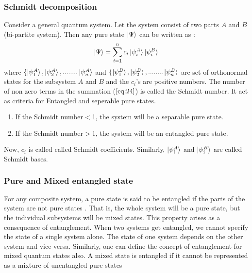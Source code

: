\documentclass[12pt,a4paper]{report}
\begin{document}
\subsubsection{Schmidt decomposition}
Consider a general quantum system. Let the system consist of two parts $A$ and $B$ (bi-partite system). Then any pure state $\ket{\Psi}$ can be written as :
\begin{equation}
\ket{\Psi} = \sum_{i=1}^{n} c_{i}\ket{\psi_{i}^{A}}\ket{\psi_{i}^{B}}
\end{equation} 
\label{eq:24}
where  $\{\ket{\psi_{1}^{A}},\ket{\psi_{2}^{A}},........\ket{\psi_{n}^{A}}$ and $\{\ket{\psi_{1}^{B}},\ket{\psi_{2}^{B}},........\ket{\psi_{n}^{B}}$ are set of orthonormal states for the subsystem $A$ and $B$ and the $c_{i}$’s are positive numbers. The number of non zero terms in the summation ($\ref{eq:24}$) is called the Schmidt number. It act as criteria for Entangled and seperable pure states.
\begin{enumerate}
\item If the Schmidt number$<$1, the system will be a separable pure state.
\item If the Schmidt number$>$1, the system will be an entangled pure state.
\end{enumerate}
Now, $c_{i}$ is called called Schmidt coefficients. Similarly, $\ket{\psi_{i}^{A}}$ and $\ket{\psi_{i}^{B}}$ are called Schmidt bases.
\subsubsection{ Pure and Mixed entangled state}
For any composite system, a pure state is said to be entangled if the parts of the system are not pure states \cite{wootters}. That is, the whole system will be a pure state, but the individual subsystems will be mixed states. This property arises as a consequence of entanglement. When two systems get entangled, we cannot specify the state of a single system alone. The state of one system depends on the other system and vice versa. Similarly, one can define the concept of entanglement for mixed quantum states also. A mixed state is entangled if it cannot be represented as a mixture of unentangled pure states
\end{document}
